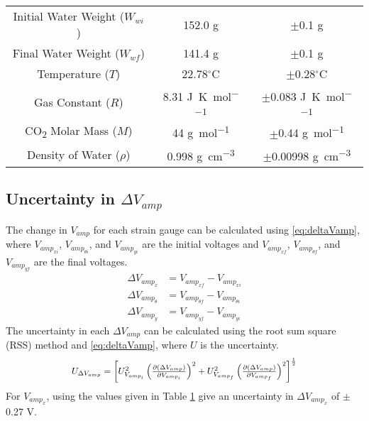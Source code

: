 \documentclass[10pt,journal,letterpaper]{IEEEtran}
\begin{document}
\begin{table}[H]
{\begin{tabular}{ccc}
Initial Water Weight ($W_{wi}$) & 152.0 g & $\pm$0.1 g \\
Final Water Weight ($W_{wf}$) & 141.4 g & $\pm$0.1 g \\
Temperature ($T$) & 22.78$^\circ$C & $\pm$0.28$^\circ$C \\
Gas Constant ($R$) \cite{b6} & 8.31 \unit{\joule\per\kelvin\per\mole} & $\pm$0.083 \unit{\joule\per\kelvin\per\mole} \\
CO\textsubscript{2} Molar Mass ($M$) \cite{b4} & 44 \unit{\gram\per\mole} & $\pm$0.44 \unit{\gram\per\mole} \\
Density of Water ($\rho$) \cite{b7} & 0.998 \unit{\gram\per\centi\meter\cubed} & $\pm$0.00998 \unit{\gram\per\centi\meter\cubed} \\
\hline \hline
\end{tabular}}
\label{tab:Uncertainty}
\end{table}

\subsection*{Uncertainty in $\Delta V_{amp}$}

The change in $V_{amp}$ for each strain gauge can be calculated using \eqref{eq:deltaVamp}, where $V_{amp_{xi}}$, $V_{amp_{\theta i}}$, and $V_{amp_{yi}}$ are the initial voltages and $V_{amp_{xf}}$, $V_{amp_{\theta f}}$, and $V_{amp_{yf}}$ are the final voltages.
\begin{subequations}
\label{eq:deltaVamp}
\begin{align}
\Delta V_{amp_{x}}&=V_{amp_{xf}}-V_{amp_{xi}} \\
\Delta V_{amp_{\theta}}&=V_{amp_{\theta f}}-V_{amp_{\theta i}} \\
\Delta V_{amp_{y}}&=V_{amp_{yf}}-V_{amp_{yi}}
\end{align}
\end{subequations}
The uncertainty in each $\Delta V_{amp}$ can be calculated using the root sum square (RSS) method and \eqref{eq:deltaVamp}, where $U$ is the uncertainty.
\begin{equation}
\label{eq:UDeltaVamp}
\resizebox{227pt}{!}{$U_{\Delta V_{amp}}=\left[U_{V_{amp_{i}}}^2 \left(\frac{\partial (\Delta V_{amp})}{\partial V_{amp_{i}}}\right)^2 + U_{V_{amp_{f}}}^2 \left(\frac{\partial (\Delta V_{amp})}{\partial V_{amp_{f}}}\right)^2 \right]^{\frac{1}{2}}$}
\end{equation}
For $V_{amp_{x}}$, using the values given in Table \ref{tab:Uncertainty} give an uncertainty in $\Delta V_{amp_{x}}$ of $\pm$0.27 V.
\end{document}
